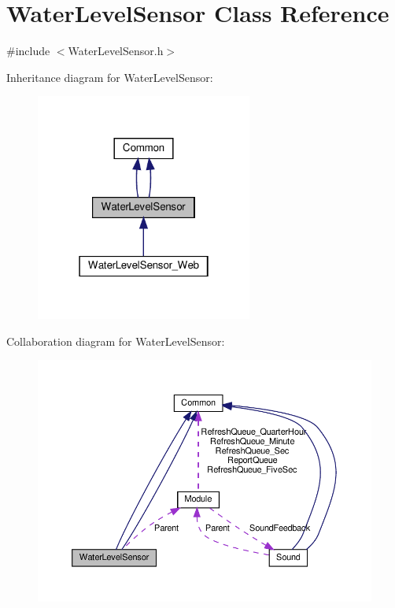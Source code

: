 \hypertarget{class_water_level_sensor}{}\section{Water\+Level\+Sensor Class Reference}
\label{class_water_level_sensor}


{\ttfamily \#include $<$Water\+Level\+Sensor.\+h$>$}



Inheritance diagram for Water\+Level\+Sensor\+:
\nopagebreak
\begin{figure}[H]
\begin{center}
\leavevmode
\includegraphics[width=202pt]{class_water_level_sensor__inherit__graph}
\end{center}
\end{figure}


Collaboration diagram for Water\+Level\+Sensor\+:
\nopagebreak
\begin{figure}[H]
\begin{center}
\leavevmode
\includegraphics[width=350pt]{class_water_level_sensor__coll__graph}
\end{center}
\end{figure}
